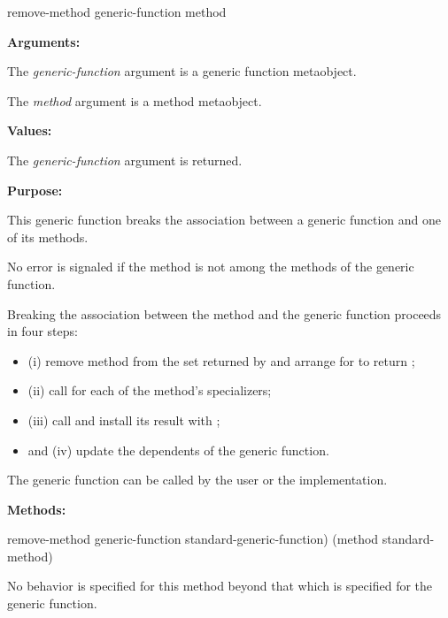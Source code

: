 \begin{defun}
remove-method generic-function method

\textbf{Arguments:}

The \emph{generic-function} argument is a generic function metaobject.

The \emph{method} argument is a method metaobject.

\textbf{Values:}

The \emph{generic-function} argument is returned.

\textbf{Purpose:}

This generic function breaks the association between a generic function and one of its methods.

No error is signaled if the method is not among the methods of the generic function.

Breaking the association between the method and the generic function proceeds in
four steps: 
\begin{itemize}
\item (i) remove method from the set returned by 
  and arrange for  to return ;

\item (ii) call  for each of the method's
  specializers;

\item (iii) call  and install its result
  with ;

\item and (iv) update the dependents of the generic function.
\end{itemize}

The generic function  can be called by the user or the implementation.

\textbf{Methods:}

\begin{defun}
remove-method generic-function standard-generic-function) (method standard-method)

No behavior is specified for this method beyond that which is specified for the
generic function.  
\end{defun}
\end{defun}

